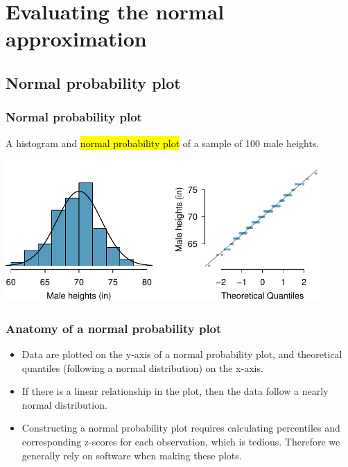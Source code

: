 
\section{Evaluating the normal approximation}


\subsection{Normal probability plot}


\begin{frame}
\frametitle{Normal probability plot}

A histogram and \hl{normal probability plot} of a sample of 100 male heights.

\begin{center}
\includegraphics[width=0.9\textwidth]{3-2_evaluating_normal_approx/figures/fcidMHeights/fcidMHeights}
\end{center}

\end{frame}


\begin{frame}
\frametitle{Anatomy of a normal probability plot}

\begin{itemize}

\item Data are plotted on the y-axis of a normal probability plot, and theoretical quantiles (following a normal distribution) on the x-axis.

\item If there is a linear relationship in the plot, then the data follow a nearly normal distribution.

\item Constructing a normal probability plot requires calculating percentiles and corresponding z-scores for each observation, which is tedious. Therefore we generally rely on software when making these plots.

\end{itemize}

\end{frame}

